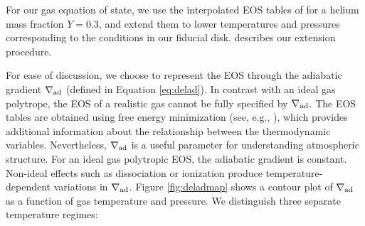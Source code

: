 


For our gas equation of state, we use the interpolated EOS tables of \citet{saumon95} for a helium mass fraction $Y=0.3$, and extend them to lower temperatures and pressures corresponding to the conditions in our fiducial disk.  describes our extension procedure.





 For ease of discussion, we choose to represent the EOS through the adiabatic gradient $\nabla_{\rm ad}$ (defined in Equation \ref{eq:delad}). In contrast with an ideal gas polytrope, the EOS of a realistic gas cannot be fully specified by $\nabla_{\rm ad}$. The \citet{saumon95} EOS tables are obtained using free energy minimization  (see, e.g., \citealt{graboske69}), which provides additional information about the relationship between the thermodynamic variables. Nevertheless, $\nabla_{\rm ad}$ is a useful parameter for understanding atmospheric structure. For an ideal gas polytropic EOS, the adiabatic gradient is constant. Non-ideal effects such as dissociation or ionization produce temperature-dependent variations in $\nabla_{\rm ad}$. Figure \ref{fig:deladmap} shows a contour plot of $\nabla_{\rm ad}$  as a function of gas temperature and pressure. We distinguish three separate temperature regimes:





